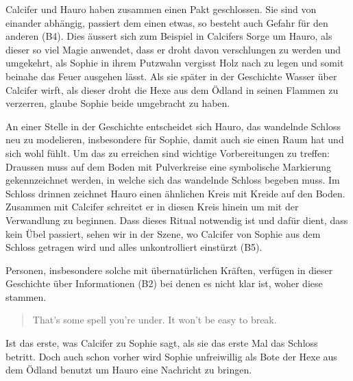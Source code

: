 Calcifer und Hauro haben zusammen einen Pakt geschlossen. Sie sind von einander abhängig, passiert dem einen etwas, so besteht auch Gefahr für den anderen (B4). Dies äussert sich zum Beispiel in Calcifers Sorge um Hauro, als dieser so viel Magie anwendet, dass er droht davon verschlungen zu werden und umgekehrt, als Sophie in ihrem Putzwahn vergisst Holz nach zu legen und somit beinahe das Feuer ausgehen lässt. Als sie später in der Geschichte Wasser über Calcifer wirft, als dieser droht die Hexe aus dem Ödland in seinen Flammen zu verzerren, glaube Sophie beide umgebracht zu haben.

An einer Stelle in der Geschichte entscheidet sich Hauro, das wandelnde Schloss neu zu modelieren, insbesondere für Sophie, damit auch sie einen Raum hat und sich wohl fühlt. Um das zu erreichen sind wichtige Vorbereitungen zu treffen: Draussen muss auf dem Boden mit Pulverkreise eine symbolische Markierung gekennzeichnet werden, in welche sich das wandelnde Schloss begeben muss. Im Schloss drinnen zeichnet Hauro einen ähnlichen Kreis mit Kreide auf den Boden. Zusammen mit Calcifer schreitet er in diesen Kreis hinein um mit der Verwandlung zu beginnen. Dass dieses Ritual notwendig ist und dafür dient, dass kein Übel passiert, sehen wir in der Szene, wo Calcifer von Sophie aus dem Schloss getragen wird und alles unkontrolliert einstürzt (B5).

Personen, insbesondere solche mit übernatürlichen Kräften, verfügen in dieser Geschichte über Informationen (B2) bei denen es nicht klar ist, woher diese stammen.\begin{quote} \glqq That's some spell you're under. It won't be easy to break.\grqq \end{quote} Ist das erste, was Calcifer zu Sophie sagt, als sie das erste Mal das Schloss betritt. Doch auch schon vorher wird Sophie unfreiwillig als Bote der Hexe aus dem Ödland benutzt um Hauro eine Nachricht zu bringen. 